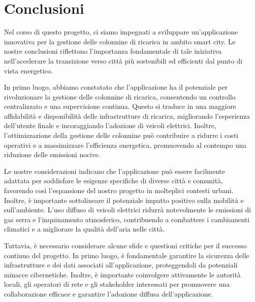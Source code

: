 



\section{Conclusioni}

Nel corso di questo progetto, ci siamo impegnati a sviluppare un'applicazione innovativa per la gestione delle colonnine di ricarica in ambito smart city. Le nostre conclusioni riflettono l'importanza fondamentale di tale iniziativa nell'accelerare la transizione verso città più sostenibili ed efficienti dal punto di vista energetico.

In primo luogo, abbiamo constatato che l'applicazione ha il potenziale per rivoluzionare la gestione delle colonnine di ricarica, consentendo un controllo centralizzato e una supervisione continua. Questo si traduce in una maggiore affidabilità e disponibilità delle infrastrutture di ricarica, migliorando l'esperienza dell'utente finale e incoraggiando l'adozione di veicoli elettrici. Inoltre, l'ottimizzazione della gestione delle colonnine può contribuire a ridurre i costi operativi e a massimizzare l'efficienza energetica, promuovendo al contempo una riduzione delle emissioni nocive.

Le nostre considerazioni indicano che l'applicazione può essere facilmente adattata per soddisfare le esigenze specifiche di diverse città e comunità, favorendo così l'espansione del nostro progetto in molteplici contesti urbani. Inoltre, è importante sottolineare il potenziale impatto positivo sulla mobilità e sull'ambiente. L'uso diffuso di veicoli elettrici ridurrà notevolmente le emissioni di gas serra e l'inquinamento atmosferico, contribuendo a combattere i cambiamenti climatici e a migliorare la qualità dell'aria nelle città.

Tuttavia, è necessario considerare alcune sfide e questioni critiche per il successo continuo del progetto. In primo luogo, è fondamentale garantire la sicurezza delle infrastrutture e dei dati associati all'applicazione, proteggendoli da potenziali minacce cibernetiche. Inoltre, è importante coinvolgere attivamente le autorità locali, gli operatori di rete e gli stakeholder interessati per promuovere una collaborazione efficace e garantire l'adozione diffusa dell'applicazione.

